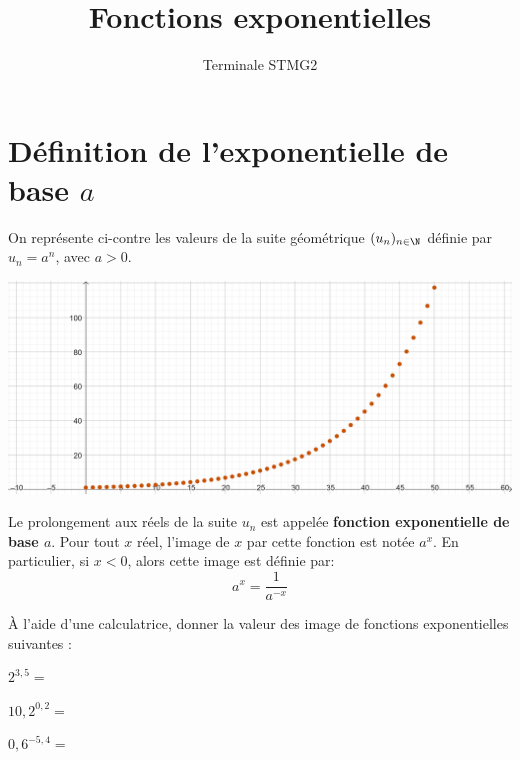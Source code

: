 \documentclass{article}
\title{Fonctions exponentielles}
\author{Terminale STMG2}
\date{}
\begin{document}
\maketitle
\section{Définition de l'exponentielle de base $a$}
\begin{tcolorbox}
On représente ci-contre les valeurs de la suite géométrique $(u_n)_{n \in \N}$ définie par $u_n = a^n$, avec $a > 0$.
\end{tcolorbox}
\begin{center}
\includegraphics[width=\textwidth]{Suite_geometrique.png}
\end{center}
\begin{tcolorbox}
\begin{definition}
Le prolongement aux réels de la suite $u_n$ est appelée \textbf{fonction exponentielle de base $a$}. Pour tout $x$ réel, l'image de $x$ par cette fonction est notée $a^x$. En particulier, si $x < 0$, alors cette image est définie par:
\begin{equation*}
a^x = \dfrac{1}{a^{-x}}
\end{equation*}
\end{definition}    
\end{tcolorbox}
\begin{example}
À l'aide d'une calculatrice, donner la valeur des image de fonctions exponentielles suivantes :
\begin{enumquestions}
\item $2^{3,5} = $\answersline
\item $10,2^{0,2} = $\answersline
\item $0,6^{-5,4} = $\answersline
\end{enumquestions}
\end{example}
\newpage
\end{document}
